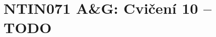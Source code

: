 \documentclass[a4paper,12pt]{amsart}
\begin{document}
\thispagestyle{empty}

\section*{NTIN071 A\&G: Cvičení 10 -- TODO}


\medskip
\end{document}
